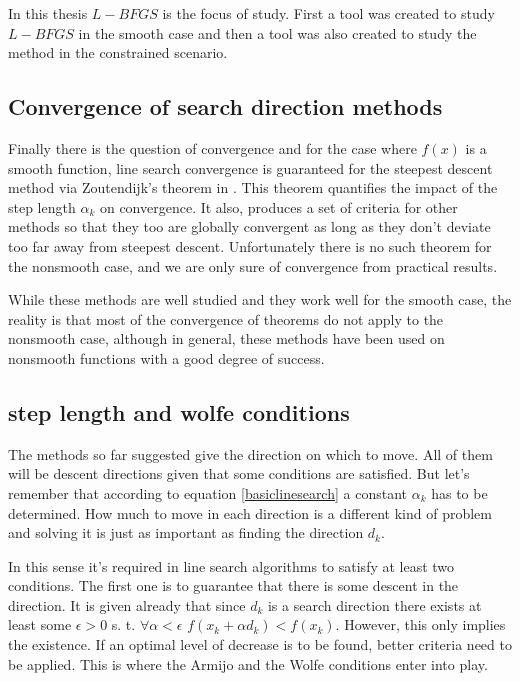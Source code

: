 In this thesis $L-BFGS$ is the focus of study.  First a tool was created to study $L-BFGS$ in the smooth case and then a tool was also created to study the method in the constrained scenario.

\subsection{Convergence of search direction methods}

Finally there is the question of convergence and for the case where $f(x)$ is a smooth function, line search convergence is guaranteed for the steepest descent method via Zoutendijk's theorem \citep{zoutendijk} in \citep{Abadie}.  This theorem quantifies the impact of the step length $\alpha_k$ on convergence.  It also, produces a set of criteria for other methods so that they too are globally convergent as long as they don't deviate too far away from steepest descent. Unfortunately there is no such theorem for the nonsmooth case, and we are only sure of convergence from practical results.

While these methods are well studied and they work well for the smooth case, the reality is that most of the convergence of theorems do not apply to the nonsmooth case, although in general, these methods have been used on nonsmooth functions with a good degree of success\citep{skaaja}.

\subsection{step length and wolfe conditions}

The methods so far suggested give the direction on which to move.  All of them will be descent directions given that some conditions are satisfied.  But let's remember that according to equation \ref{basiclinesearch} a constant $\alpha_k$ has to be determined.  How much to move in each direction is a different kind of problem and solving it is just as important as finding the direction $d_k$.

In this sense it's required in line search algorithms to satisfy at least two conditions.  The first one is to guarantee that there is some descent in the direction.  It is given already that since $d_k$ is a search direction there exists at least some $\epsilon > 0$ s. t. $\forall \alpha < \epsilon$ $f(x_k + \alpha d_k) < f(x_k)$.  However, this only implies the existence.  If an optimal level of decrease is to be found, better criteria need to be applied.  This is where the Armijo and the Wolfe conditions enter into play.

